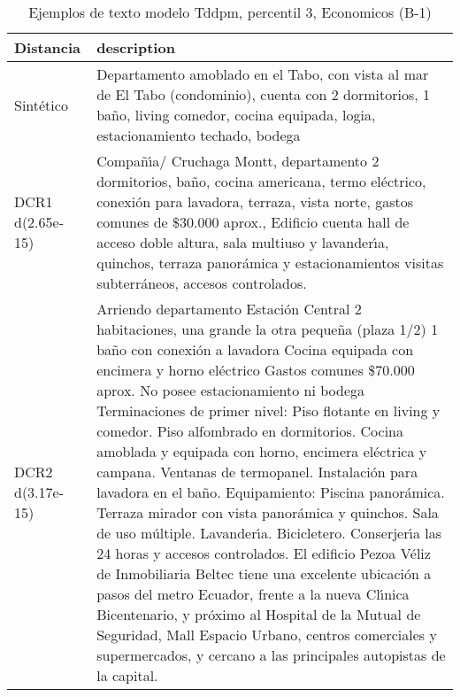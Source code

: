 \begin{table}[H]
\centering
\fontsize{10}{14}\selectfont
\caption{Ejemplos de texto modelo Tddpm, percentil 3, Economicos (B-1)}
\label{table-example-economicos-b-1-tddpm_mlp-3p-text}
\begin{tabular}{|l|m{35em}|}
\hline
\rowcolor[gray]{0.8}
Distancia & description \\
\hline Sintético & Departamento amoblado en el Tabo, con vista al mar de El Tabo (condominio), cuenta con 2 dormitorios, 1 ba\~no, living comedor, cocina equipada, logia, estacionamiento techado, bodega \\
\hline DCR1 d(2.65e-15) & Compa\~n{\'\i}a/ Cruchaga Montt, departamento 2 dormitorios, ba\~no, cocina americana, termo el\'ectrico, conexi\'on para lavadora, terraza, vista norte, gastos comunes de \$30.000 aprox.,
 Edificio cuenta hall de acceso doble altura, sala multiuso y lavander{\'\i}a, quinchos, terraza panor\'amica y estacionamientos visitas subterr\'aneos, accesos controlados. \\
\hline DCR2 d(3.17e-15) & Arriendo departamento Estaci\'on Central  2 habitaciones, una grande la otra peque\~na (plaza 1/2) 1 ba\~no con conexi\'on a lavadora Cocina equipada con encimera y horno el\'ectrico Gastos comunes \$70.000 aprox.  No posee estacionamiento ni bodega  Terminaciones de primer nivel:   Piso flotante en living y comedor.   Piso alfombrado en dormitorios.   Cocina amoblada y equipada con horno, encimera el\'ectrica y campana.   Ventanas de termopanel.   Instalaci\'on para lavadora en el ba\~no.  Equipamiento:   Piscina panor\'amica.   Terraza mirador con vista panor\'amica y quinchos.   Sala de uso m\'ultiple.   Lavander{\'\i}a.   Bicicletero.   Conserjer{\'\i}a las 24 horas y accesos controlados.  El edificio Pezoa V\'eliz de Inmobiliaria Beltec tiene una excelente ubicaci\'on a pasos del metro Ecuador, frente a la nueva Cl{\'\i}nica Bicentenario, y pr\'oximo al Hospital de la Mutual de Seguridad, Mall Espacio Urbano, centros comerciales y supermercados, y cercano a las principales autopistas de la capital. \\
\hline
\end{tabular}
\end{table}
